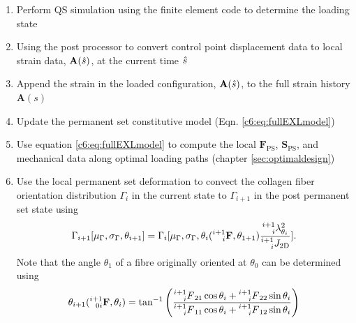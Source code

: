     \begin{enumerate}
        \item Perform QS simulation using the finite element code to determine the loading state
        \item Using the post processor to convert control point displacement data to local strain data, $\mathbf{A}(\Hat{s})$, at the current time $\Hat{s}$
        \item Append the strain in the loaded configuration, $\mathbf{A}(\Hat{s})$, to the full strain history $\mathbf{A}(s)$
        \item Update the permanent set constitutive model (Eqn. \ref{c6:eq:fullEXLmodel})
        \item Use equation \ref{c6:eq:fullEXLmodel} to compute the local $\mathbf{F}_\mathrm{PS}$, 
        $\mathbf{S}_\mathrm{PS}$, and mechanical data along optimal loading paths (chapter \ref{sec:optimaldesign})
        \item Use the local permanent set deformation to convect the collagen fiber orientation distribution $\Gamma_i$ in the current state to $\Gamma_{i+1}$ in the post permanent set state using 
        \begin{equation}\label{c6:eqn:45}
        \begin{aligned}
        \Gamma_{i+1}[\mu_\Gamma,\sigma_\Gamma, \theta_{i+1}] = \Gamma_i[\mu_\Gamma, \sigma_\Gamma, \theta_i(\prescript{i+1}{i}{\mathbf{F}},\theta_{1+1})\frac{\prescript{i+1}{i}{\lambda}_{\theta_i}^2}{\prescript{i+1}{i}{J_\mathrm{2D}}}].
        \end{aligned}
        \end{equation}
        Note that the angle $\theta_1$ of a fibre originally oriented at $\theta_0$ can be determined using
        \begin{equation}\label{c6:eqn:46}
        \begin{aligned}
        \theta_{i+1}(\prescript{i+1}{0i}{\mathbf{F}},\theta_i) = \tan^{-1}\left(\frac{\prescript{i+1}{i}{F}_{21}\cos{\theta_i} + \prescript{i+1}{i}{F}_{22}\sin{\theta_i}}{\prescript{i+1}{i}{F}_{11}\cos{\theta_i} + \prescript{i+1}{i}{F}_{12}\sin{\theta_i}}\right)
        \end{aligned}
        \end{equation}

\end{enumerate}
